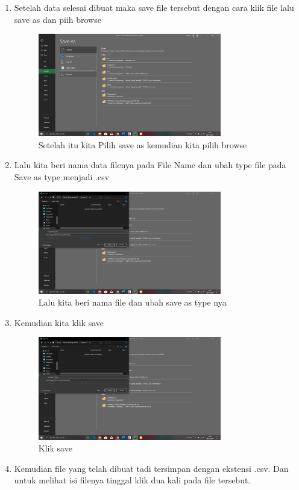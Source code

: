 \documentclass[a4paper, 12pt]{article}
\begin{document}
\begin{enumerate}
\begin{enumerate}
\begin{figure}[H]
	\end{figure} 
\item Setelah data selesai dibuat maka save file tersebut dengan cara klik file lalu save as dan piih browse
 	\begin{figure}[H]
			\includegraphics[width=8cm]{figures/4.png}
			\centering
			\caption{Setelah itu kita Pilih save as kemudian kita pilih browse}
	\end{figure} 
\item Lalu kita beri nama data filenya pada File Name dan ubah type file pada Save as type menjadi .csv
 	\begin{figure}[H]
			\includegraphics[width=8cm]{figures/5.png}
			\centering
			\caption{Lalu kita beri nama file dan ubah save as type nya}
	\end{figure}
\item Kemudian kita klik save
 	\begin{figure}[H]
			\includegraphics[width=8cm]{figures/6.png}
			\centering
			\caption{Klik save}
	\end{figure} 
\item Kemudian file yang telah dibuat tadi tersimpan dengan ekstensi .csv. Dan untuk melihat isi filenya tinggal klik dua kali pada file tersebut.

\end{enumerate}
\end{enumerate}
\end{document}
